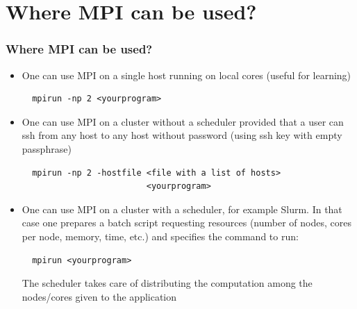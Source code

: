\documentclass{beamer}
\begin{document}
\section{Where MPI can be used?}
\begin{frame}[fragile]
  \frametitle{Where MPI can be used?}
  \begin{itemize}
  \item One can use MPI on a single host running on local cores (useful for learning)
{\color{mycolorcli}
\begin{verbatim}
  mpirun -np 2 <yourprogram>
\end{verbatim}
}
  \item One can use MPI on a cluster without a scheduler provided that a user can 
    ssh from any host to any host without password (using ssh key with empty passphrase)
{\color{mycolorcli}
\begin{verbatim}
  mpirun -np 2 -hostfile <file with a list of hosts> 
                         <yourprogram>
\end{verbatim}
}
\item One can use MPI on a cluster with a scheduler, for example Slurm. 
  In that case one prepares a batch script requesting resources (number of nodes, cores per node, 
  memory, time, etc.) and
  specifies the command to run:
{\color{mycolorcli}
\begin{verbatim}
  mpirun <yourprogram>
\end{verbatim}
}
The scheduler takes care of distributing the computation among the nodes/cores given to the application
\end{itemize}
\end{frame}
\end{document}
